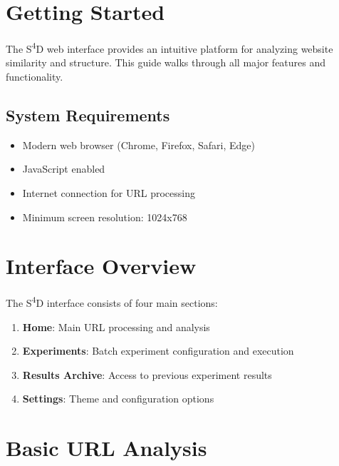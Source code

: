 \section{Getting Started}
\label{sec:getting-started}

The S\textsuperscript{4}D web interface provides an intuitive platform for analyzing website similarity and structure. This guide walks through all major features and functionality.

\subsection{System Requirements}
\label{subsec:system-requirements}

\begin{itemize}
    \item Modern web browser (Chrome, Firefox, Safari, Edge)
    \item JavaScript enabled
    \item Internet connection for URL processing
    \item Minimum screen resolution: 1024x768
\end{itemize}

\section{Interface Overview}
\label{sec:interface-overview}

The S\textsuperscript{4}D interface consists of four main sections:

\begin{enumerate}
    \item \textbf{Home}: Main URL processing and analysis
    \item \textbf{Experiments}: Batch experiment configuration and execution
    \item \textbf{Results Archive}: Access to previous experiment results
    \item \textbf{Settings}: Theme and configuration options
\end{enumerate}


\section{Basic URL Analysis}
\label{sec:basic-url-analysis}

